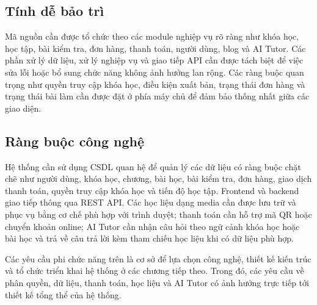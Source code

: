 ﻿\documentclass[../DoAn.tex]{subfiles}
\begin{document}
\subsection{Tính dễ bảo trì}
\label{subsection:2.4.6}

Mã nguồn cần được tổ chức theo các module nghiệp vụ rõ ràng như khóa học, học tập, bài kiểm tra, đơn hàng, thanh toán, người dùng, blog và AI Tutor. Các phần xử lý dữ liệu, xử lý nghiệp vụ và giao tiếp API cần được tách biệt để việc sửa lỗi hoặc bổ sung chức năng không ảnh hưởng lan rộng. Các ràng buộc quan trọng như quyền truy cập khóa học, điều kiện xuất bản, trạng thái đơn hàng và trạng thái bài làm cần được đặt ở phía máy chủ để đảm bảo thống nhất giữa các giao diện.

\subsection{Ràng buộc công nghệ}
\label{subsection:2.4.7}

Hệ thống cần sử dụng CSDL quan hệ để quản lý các dữ liệu có ràng buộc chặt chẽ như người dùng, khóa học, chương, bài học, bài kiểm tra, đơn hàng, giao dịch thanh toán, quyền truy cập khóa học và tiến độ học tập. Frontend và backend giao tiếp thông qua REST API. Các học liệu dạng media cần được lưu trữ và phục vụ bằng cơ chế phù hợp với trình duyệt; thanh toán cần hỗ trợ mã QR hoặc chuyển khoản online; AI Tutor cần nhận câu hỏi theo ngữ cảnh khóa học hoặc bài học và trả về câu trả lời kèm tham chiếu học liệu khi có dữ liệu phù hợp.

Các yêu cầu phi chức năng trên là cơ sở để lựa chọn công nghệ, thiết kế kiến trúc và tổ chức triển khai hệ thống ở các chương tiếp theo. Trong đó, các yêu cầu về phân quyền, dữ liệu, thanh toán, học liệu và AI Tutor có ảnh hưởng trực tiếp tới thiết kế tổng thể của hệ thống.
\end{document}
